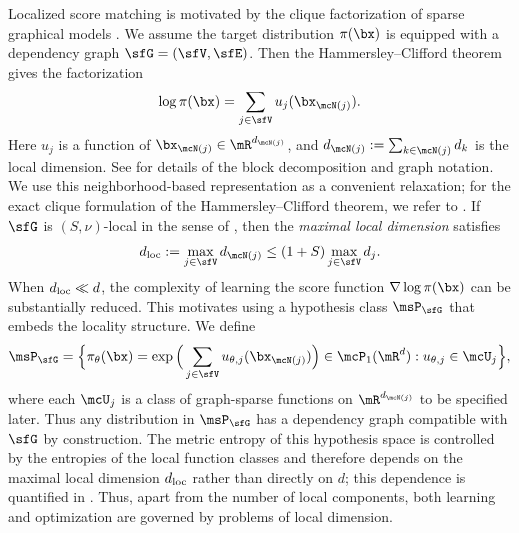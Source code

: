 \documentclass[11pt]{article}
\begin{document}
Localized score matching is motivated by the clique factorization of sparse graphical models \cite{clifford1990markov,MR2778120}. We assume the target distribution $\pi(\bx)$ is equipped with a dependency graph $\sfG=(\sfV,\sfE)$. Then the Hammersley--Clifford theorem \cite{clifford1971markov} gives the factorization
\begin{equation}
\label{eqn:clique_decomp}
    \log \pi(\bx) = \sum_{j\in \sfV} u_j(\bx_{\mcN(j)}). 
\end{equation}
Here $u_j$ is a function of $\bx_{\mcN(j)} \in \mR^{d_{\mcN(j)}}$, and $d_{\mcN(j)} := \sum_{k\in \mcN(j)} d_k$ is the local dimension.
See  for details of the block decomposition and graph notation.
We use this neighborhood-based representation as a convenient relaxation; for the exact clique formulation of the Hammersley--Clifford theorem, we refer to \cite{clifford1971markov,MR2778120}.
%
If $\sfG$ is $(S,\nu)$-local in the sense of , then the \emph{maximal local dimension} satisfies
\begin{equation}
\label{eqn:loc_dim}
    d_{\rm loc} := \max_{j \in \sfV} d_{\mcN(j)} \le (1+S) \max_{j \in \sfV} d_j. 
\end{equation}
When $d_{\rm loc} \ll d$, the complexity of learning the score function $\nabla \log\pi(\bx)$ can be substantially reduced.
%
This motivates using a hypothesis class $\msP_\sfG$ that embeds the locality structure. We define
\begin{equation}
\label{eqn:G_hypo_class}
    \msP_\sfG = \Big\{ \pi_\theta(\bx) = \exp \Big( \sum_{j\in \sfV} u_{\theta,j}(\bx_{\mcN(j)}) \Big) \in \mcP_1(\mR^d) : u_{\theta,j} \in \mcU_j \Big\},
\end{equation}
where each $\mcU_j$ is a class of graph-sparse functions on $\mR^{d_{\mcN(j)}}$ to be specified later.
Thus any distribution in $\msP_\sfG$ has a dependency graph compatible with $\sfG$ by construction.
%
The metric entropy of this hypothesis space \cite{MR1385671} is controlled by the entropies of the local function classes and therefore depends on the maximal local dimension $d_{\rm loc}$ rather than directly on $d$; this dependence is quantified in .
Thus, apart from the number of local components, both learning and optimization are governed by problems of local dimension.
\end{document}
